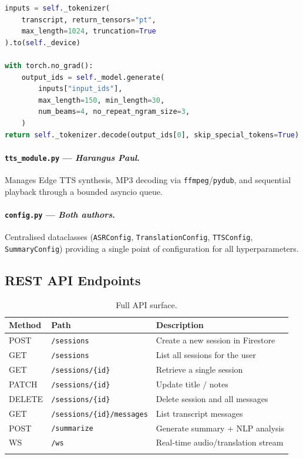 \documentclass[12pt,a4paper]{report}
\begin{document}
\begin{lstlisting}[language=Python, caption={BART summarization call.}]
inputs = self._tokenizer(
    transcript, return_tensors="pt",
    max_length=1024, truncation=True
).to(self._device)

with torch.no_grad():
    output_ids = self._model.generate(
        inputs["input_ids"],
        max_length=150, min_length=30,
        num_beams=4, no_repeat_ngram_size=3,
    )
return self._tokenizer.decode(output_ids[0], skip_special_tokens=True)
\end{lstlisting}

\paragraph{\texttt{tts\_module.py} — \textit{Harangus Paul}.}
Manages Edge TTS synthesis, MP3 decoding via \texttt{ffmpeg}/\texttt{pydub},
and sequential playback through a bounded asyncio queue.

\paragraph{\texttt{config.py} — \textit{Both authors}.}
Centralised dataclasses (\texttt{ASRConfig}, \texttt{TranslationConfig},
\texttt{TTSConfig}, \texttt{SummaryConfig}) providing a single point of
configuration for all hyperparameters.

\subsection{REST API Endpoints}

\begin{longtable}{p{1.5cm} p{4.5cm} p{7cm}}
  \toprule
  \textbf{Method} & \textbf{Path} & \textbf{Description} \\
  \midrule
  POST   & \texttt{/sessions}                    & Create a new session in Firestore \\
  GET    & \texttt{/sessions}                    & List all sessions for the user \\
  GET    & \texttt{/sessions/\{id\}}             & Retrieve a single session \\
  PATCH  & \texttt{/sessions/\{id\}}             & Update title / notes \\
  DELETE & \texttt{/sessions/\{id\}}             & Delete session and all messages \\
  GET    & \texttt{/sessions/\{id\}/messages}    & List transcript messages \\
  POST   & \texttt{/summarize}                   & Generate summary + NLP analysis \\
  WS     & \texttt{/ws}                          & Real-time audio/translation stream \\
  \bottomrule
  \caption{Full API surface.}
\end{longtable}
\end{document}

